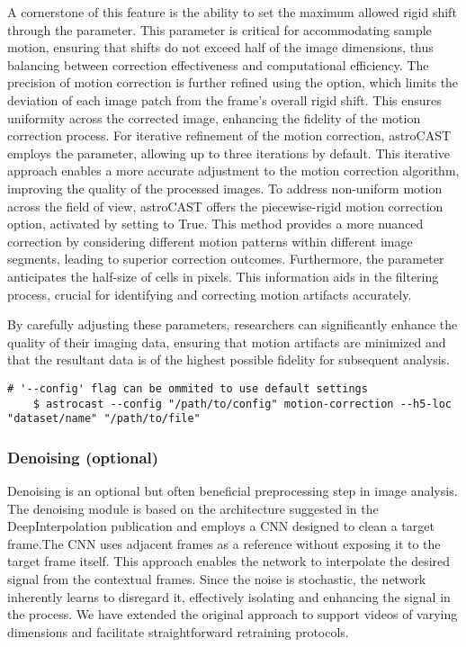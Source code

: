 A cornerstone of this feature is the ability to set the maximum allowed rigid shift through the  parameter. This parameter is critical for accommodating sample motion, ensuring that shifts do not exceed half of the image dimensions, thus balancing between correction effectiveness and computational efficiency. The precision of motion correction is further refined using the  option, which limits the deviation of each image patch from the frame's overall rigid shift. This ensures uniformity across the corrected image, enhancing the fidelity of the motion correction process. For iterative refinement of the motion correction, astroCAST employs the  parameter, allowing up to three iterations by default. This iterative approach enables a more accurate adjustment to the motion correction algorithm, improving the quality of the processed images. To address non-uniform motion across the field of view, astroCAST offers the piecewise-rigid motion correction option, activated by setting  to True. This method provides a more nuanced correction by considering different motion patterns within different image segments, leading to superior correction outcomes. Furthermore, the  parameter anticipates the half-size of cells in pixels. This information aids in the filtering process, crucial for identifying and correcting motion artifacts accurately.

By carefully adjusting these parameters, researchers can significantly enhance the quality of their imaging data, ensuring that motion artifacts are minimized and that the resultant data is of the highest possible fidelity for subsequent analysis.

\begin{lstlisting}[style=bashStyle]
    # '--config' flag can be ommited to use default settings
    $ astrocast --config "/path/to/config" motion-correction --h5-loc "dataset/name" "/path/to/file"
\end{lstlisting}

\subsubsection{Denoising (optional)}

Denoising is an optional but often beneficial preprocessing step in image analysis. The denoising module is based on the architecture suggested in the DeepInterpolation publication\citep{lecoq_removing_2021} and employs a \ac{CNN} designed to clean a target frame.The \ac{CNN} uses adjacent frames as a reference without exposing it to the target frame itself. This approach enables the network to interpolate the desired signal from the contextual frames. Since the noise is stochastic, the network inherently learns to disregard it, effectively isolating and enhancing the signal in the process. We have extended the original approach to support videos of varying dimensions and facilitate straightforward retraining protocols.

